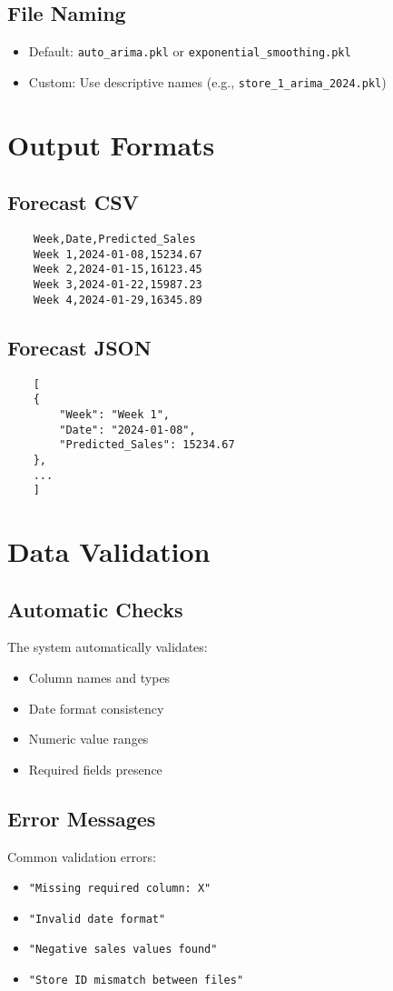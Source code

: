 \subsection{File Naming}
\begin{itemize}
	\item Default: \verb|auto_arima.pkl| or \verb|exponential_smoothing.pkl|
	\item Custom: Use descriptive names (e.g., \verb|store_1_arima_2024.pkl|)
\end{itemize}

\section{Output Formats}

\subsection{Forecast CSV}
\begin{verbatim}
	Week,Date,Predicted_Sales
	Week 1,2024-01-08,15234.67
	Week 2,2024-01-15,16123.45
	Week 3,2024-01-22,15987.23
	Week 4,2024-01-29,16345.89
\end{verbatim}

\subsection{Forecast JSON}
\begin{verbatim}
	[
	{
		"Week": "Week 1",
		"Date": "2024-01-08",
		"Predicted_Sales": 15234.67
	},
	...
	]
\end{verbatim}

\section{Data Validation}

\subsection{Automatic Checks}
The system automatically validates:
\begin{itemize}
	\item Column names and types
	\item Date format consistency
	\item Numeric value ranges
	\item Required fields presence
\end{itemize}

\subsection{Error Messages}
Common validation errors:
\begin{itemize}
	\item \verb|"Missing required column: X"|
	\item \verb|"Invalid date format"|
	\item \verb|"Negative sales values found"|
	\item \verb|"Store ID mismatch between files"|
\end{itemize}

